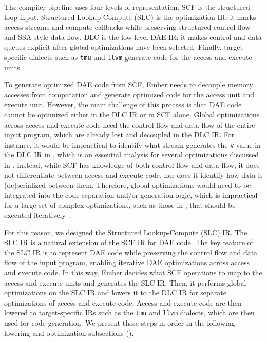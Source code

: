 The compiler pipeline uses four levels of representation. SCF is the structured-loop input. Structured Lookup-Compute (SLC) is the optimization IR: it marks access streams and compute callbacks while preserving structured control flow and SSA-style data flow. DLC is the low-level DAE IR: it makes control and data queues explicit after global optimizations have been selected. Finally, target-specific dialects such as \texttt{tmu} and \texttt{llvm} generate code for the access and execute units.

To generate optimized DAE code from SCF, Ember needs to decouple memory accesses from computation and generate optimized code for the access unit and execute unit. However, the main challenge of this process is that DAE code cannot be optimized either in the DLC IR or in SCF alone. Global optimizations across access and execute code need the control flow and data flow of the entire input program, which are already lost and decoupled in the DLC IR. For instance, it would be impractical to identify what stream generates the \texttt{v} value in the DLC IR in , which is an essential analysis for several optimizations discussed in . Instead, while SCF has knowledge of both control flow and data flow, it does not differentiate between access and execute code, nor does it identify how data is (de)serialized between them. Therefore, global optimizations would need to be integrated into the code separation and/or generation logic, which is impractical for a large set of complex optimizations, such as those in , that should be executed iteratively~\cite{lattner2021cgo}.

For this reason, we designed the Structured Lookup-Compute (SLC) IR. The SLC IR is a natural extension of the SCF IR for DAE code. The key feature of the SLC IR is to represent DAE code while preserving the control flow and data flow of the input program, enabling iterative DAE optimizations across access and execute code. In this way, Ember decides what SCF operations to map to the access and execute units and generates the SLC IR. Then, it performs global optimizations on the SLC IR and lowers it to the DLC IR for separate optimizations of access and execute code. Access and execute code are then lowered to target-specific IRs such as the \texttt{tmu} and \texttt{llvm} dialects, which are then used for code generation. We present these steps in order in the following lowering and optimization subsections ().


